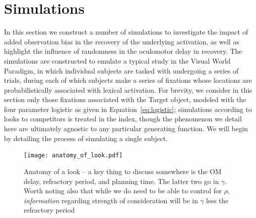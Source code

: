 %
%
%


%
\section{Simulations}

In this section we construct a number of simulations to investigate the impact of added observation bias in the recovery of the underlying activation, as well as highlight the influence of randomness in the oculomotor delay in recovery. The simulations are constructed to emulate a typical study in the Visual World Paradigm, in which individual subjects are tasked with undergoing a series of trials, during each of which subjects make a series of fixations whose locations are probabilistically associated with lexical activation. For brevity, we consider in this section only those fixations associated with the Target object, modeled with the four parameter logistic as given in Equation~\ref{eq:logistic}; simulations according to looks to competitors is treated in the index, though the phenomenon we detail here are ultimately agnostic to any particular generating function. We will begin by detailing the process of simulating a single subject. 


\begin{figure}[H]
\centering
\texttt{[image: anatomy\_of\_look.pdf]}
\caption{Anatomy of a look -- a key thing to discuss somewhere is the OM delay, refractory period, and planning time. The latter two go in $\gamma$. Worth noting also that while we do need to be able to control for $\rho$, \textit{information} regarding strength of consideration will be in $\gamma$ less the refractory period}
\label{fig:anatomy_of_look}
\end{figure}


